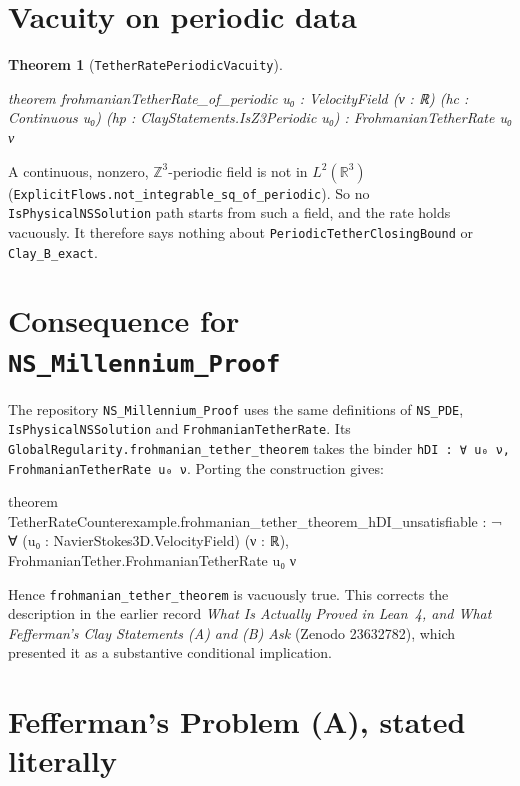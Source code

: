 \documentclass[11pt,a4paper]{article}
\newtheorem{theorem}{Theorem}[section]
\theoremstyle{definition}
\theoremstyle{remark}
\newcommand{\R}{\mathbb{R}}
\newcommand{\Z}{\mathbb{Z}}
\newcommand{\lean}[1]{\texttt{#1}}
\begin{document}
\section{Vacuity on periodic data}\label{sec:periodic}

\begin{theorem}[\lean{TetherRatePeriodicVacuity}]
\begin{leancode}
theorem frohmanianTetherRate_of_periodic {u₀ : VelocityField} (ν : ℝ)
    (hc : Continuous u₀) (hp : ClayStatements.IsZ3Periodic u₀) :
    FrohmanianTetherRate u₀ ν
\end{leancode}
\end{theorem}
\noindent A continuous, nonzero, $\Z^3$-periodic field is not in $L^2(\R^3)$ (\lean{ExplicitFlows.not\_integrable\_sq\_of\_periodic}). So no \lean{IsPhysicalNSSolution} path starts from such a field, and the rate holds vacuously. It therefore says nothing about \lean{PeriodicTetherClosingBound} or \lean{Clay\_B\_exact}.

\section{Consequence for \texttt{NS\_Millennium\_Proof}}\label{sec:nsmp}

The repository \lean{NS\_Millennium\_Proof} uses the same definitions of \lean{NS\_PDE}, \lean{IsPhysicalNSSolution} and \lean{FrohmanianTetherRate}. Its \lean{GlobalRegularity.frohmanian\_tether\_theorem} takes the binder \lean{hDI : ∀ u₀ ν, FrohmanianTetherRate u₀ ν}. Porting the construction gives:
\begin{leancode}
theorem TetherRateCounterexample.frohmanian_tether_theorem_hDI_unsatisfiable :
    ¬ ∀ (u₀ : NavierStokes3D.VelocityField) (ν : ℝ),
      FrohmanianTether.FrohmanianTetherRate u₀ ν
\end{leancode}
Hence \lean{frohmanian\_tether\_theorem} is vacuously true. This corrects the description in the earlier record \emph{What Is Actually Proved in Lean~4, and What Fefferman's Clay Statements (A) and (B) Ask} (Zenodo 23632782), which presented it as a substantive conditional implication.

\section{Fefferman's Problem (A), stated literally}\label{sec:fefferman}
\end{document}
